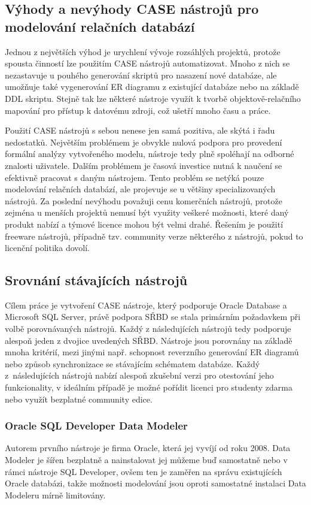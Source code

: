 \documentclass[czech,bachelor,public,dept460,male,oneside]{diploma}
\begin{document}
	\subsection{Výhody a nevýhody CASE nástrojů pro modelování relačních databází}
	Jednou z největších výhod je urychlení vývoje rozsáhlých projektů, protože spousta činností lze použitím CASE nástrojů automatizovat. Mnoho z nich se nezastavuje u pouhého generování skriptů pro nasazení nové databáze, ale umožňuje také vygenerování ER diagramu z existující databáze nebo na základě DDL skriptu. Stejně tak lze některé nástroje využít k tvorbě objektově-relačního mapování pro přístup k datovému zdroji, což ušetří mnoho času a práce. 
	
	Použití CASE nástrojů s sebou nenese jen samá pozitiva, ale skýtá i řadu nedostatků. Největším problémem je obvykle nulová podpora pro provedení formální analýzy vytvořeného modelu, nástroje tedy plně spoléhají na odborné znalosti uživatele. Dalším problémem je časová investice nutná k naučení se efektivně pracovat s daným nástrojem. Tento problém se netýká pouze modelování relačních databází, ale projevuje se u většiny specializovaných nástrojů.	Za poslední nevýhodu považuji cenu komerčních nástrojů, protože zejména u menších projektů nemusí být využity veškeré možnosti, které daný produkt nabízí a týmové licence mohou být velmi drahé. Řešením je použití freeware nástrojů, případně tzv. community verze některého z nástrojů, pokud to licenční politika dovolí.
	
	\subsection{Srovnání stávajících nástrojů}
	Cílem práce je vytvoření CASE nástroje, který podporuje Oracle Database a Microsoft SQL Server, právě podpora SŘBD se stala primárním požadavkem při volbě porovnávaných nástrojů. Každý z následujících nástrojů tedy podporuje alespoň jeden z dvojice uvedených SŘBD. Nástroje jsou porovnány na základě mnoha kritérií, mezi jinými např. schopnost reverzního generování ER diagramů nebo způsob synchronizace se stávajícím schématem databáze. Každý z~následujících nástrojů nabízí alespoň zkušební verzi pro otestování jeho funkcionality, v ideálním případě je možné pořídit licenci pro studenty zdarma nebo využít bezplatné community edice. 
	
		\subsubsection{Oracle SQL Developer Data Modeler}
		Autorem prvního nástroje je firma Oracle, která jej vyvíjí od roku 2008. Data Modeler je šířen bezplatně a nainstalovat jej můžeme buď samostatně nebo v rámci nástroje SQL Developer, ovšem ten je zaměřen na správu existujících Oracle databázi, takže možnosti modelování jsou oproti samostatné instalaci Data Modeleru mírně limitovány.
		
\end{document}
